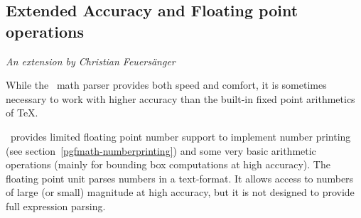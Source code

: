%
%
%

\subsection{Extended Accuracy and Floating point operations}

{\small \emph{An extension by Christian Feuers\"anger}}
\vspace{0.4cm}%

\label{pgfmath-floatunit}

\noindent
While the \pgfname\ math parser provides both speed and comfort, it is sometimes necessary to work with higher accuracy than the built-in fixed point arithmetics of \TeX. 

\pgfname\ provides limited floating point number support to implement number printing (see section~\ref{pgfmath-numberprinting}) and some very basic arithmetic operations (mainly for bounding box computations at high accuracy). The floating point unit parses numbers in a text-format. It allows access to numbers of large (or small) magnitude at high accuracy, but it is not designed to provide full expression parsing.

